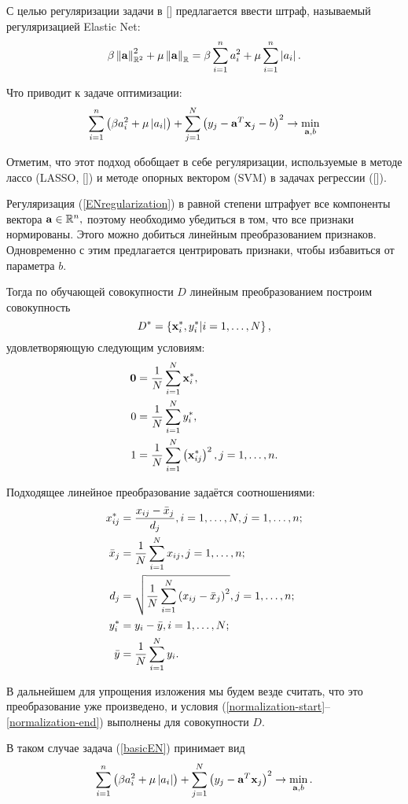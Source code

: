 С целью регуляризации задачи в [] предлагается ввести штраф, называемый регуляризацией Elastic Net:
\begin{equation}
	\label{ENregularization}
	\beta \left\|{\boldsymbol{\mathbf{a}}}\right\|_{\mathbb R^2}^2 + \mu \left\|{\boldsymbol{\mathbf{a}}}\right\|_{\mathbb R} 
	= \beta \sum\limits_{i=1}^n a_i^2 + \mu \sum\limits_{i=1}^n \left|a_i\right|.
\end{equation}

Что приводит к задаче оптимизации: 
\begin{equation}
	\label{basicEN}
	\sum_{i=1}^n\left(\beta a_i^2 + \mu \left|a_i\right|\right) 
	+ \sum_{j=1}^N\left(y_j - \boldsymbol{\mathbf{a}}^T \boldsymbol{\mathbf{x}}_j - b\right)^2 
	\to \mathop{\mbox{min}}\limits_{\boldsymbol{\mathbf{a}}, b}
\end{equation}

Отметим, что этот подход обобщает в себе регуляризации, используемые в методе лассо (LASSO, []) и методе опорных вектором (SVM) в задачах регрессии ([]).

Регуляризация (\ref{ENregularization}) в равной степени штрафует все компоненты вектора $\boldsymbol{\mathbf{a}}\in \mathbb R^n,$ поэтому необходимо убедиться в том, что все признаки нормированы. 
Этого можно добиться линейным преобразованием признаков. 
Одновременно с этим предлагается центрировать признаки, чтобы избавиться от параметра $b$.

Тогда по обучающей совокупности $D$ линейным преобразованием построим совокупность
\begin{equation*}
	D^* = \left\{\boldsymbol{\mathbf{x}}^*_i, y^*_i | i = 1, \ldots, N\right\}, 
\end{equation*}
удовлетворяющую следующим условиям:
\begin{align}
	\label{normalization-start}
	\boldsymbol{\mathbf{0}} 	&= \frac1N\sum\limits_{i=1}^N\boldsymbol{\mathbf{x}}^*_i, \\
	0 		&= \frac1N\sum\limits_{i=1}^N y^*_i, \\
	\label{normalization-end}
	1 		&= \frac1N\sum\limits_{i=1}^N\left(\boldsymbol{\mathbf{x}}^*_{ij}\right)^2, j=1,\ldots, n.
\end{align}

\newcommand\oi[2]{#1=1, \ldots, #2}
Подходящее линейное преобразование задаётся соотношениями:
\begin{align*}
	x^*_{ij} 	&= \frac{x_{ij} - \bar x_j}{d_j}, \oi iN, \oi jn;\\
	\bar x_j 	&= \frac1N\suml_{i=1}^N x_{ij}, \oi jn;\\
	d_j 		&= \sqrt{\frac1N\suml_{i=1}^N \cbr{x_{ij}-\bar x_j}^2}, \oi jn;\\
	y^*_i 		&= y_i - \bar y, \oi iN;\\
	\bar y 		&= \frac1N\suml_{i=1}^N y_i. \\
\end{align*}

В дальнейшем для упрощения изложения мы будем везде считать, что это преобразование уже произведено, и условия (\ref{normalization-start}--\ref{normalization-end}) выполнены для совокупности $D.$

В таком случае задача (\ref{basicEN}) принимает вид
\begin{equation}
	\label{mainEN}
	\sum_{i=1}^n\left(\beta a_i^2 + \mu \left|a_i\right|\right) 
	+ \sum_{j=1}^N\left(y_j - \boldsymbol{\mathbf{a}}^T \boldsymbol{\mathbf{x}}_j\right)^2 
	\to \mathop{\mbox{min}}\limits_{\boldsymbol{\mathbf{a}}, b}.
\end{equation}